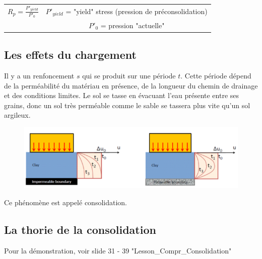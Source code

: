 \medskip

\begin{center}
\begin{tabular}{c|c}
    $R_p = \frac{P'_{yield}}{P'_0}$  &   $P'_{yield}$ = "yield" stress (pression de préconsolidation)  \\
      &  $P'_0$ = pression "actuelle"     
\end{tabular}
\end{center}

\subsection{Les effets du chargement}

Il y a un renfoncement $s$ qui se produit sur une période $t$. Cette période dépend de la perméabilité du matériau en présence, de la longueur du chemin de drainage et des conditions limites. Le sol se tasse en évacuant l'eau présente entre ses grains, donc un sol très perméable comme le sable se tassera plus vite qu'un sol argileux. 

\begin{figure}[h!]
\center
   \includegraphics[scale=1]{Verastegui/images/V2.PNG}
\end{figure}

Ce phénomène est appelé consolidation.

\subsection{La thorie de la consolidation}

Pour la démonstration, voir slide 31 - 39 "Lesson\_Compr\_Consolidation"

